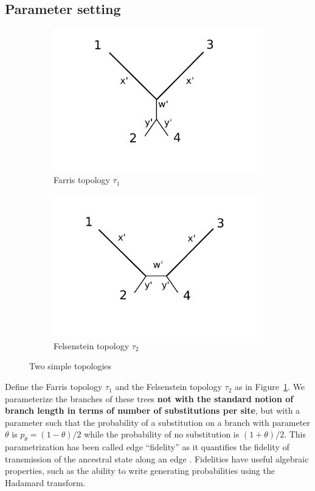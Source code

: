 \documentclass{article}
\begin{document}
\subsection{Parameter setting}

\begin{figure}
\centering
\begin{subfigure}{.45\linewidth}
\centering
\includegraphics[width=.95\textwidth]{farris_blank}
\caption[short]{Farris topology $\tau_1$}
\end{subfigure}
\begin{subfigure}{.45\linewidth}
\centering
\includegraphics[width=.95\textwidth]{felsenstein_blank}
\caption[short]{Felsenstein topology $\tau_2$}
\end{subfigure}
\caption{Two simple topologies}
\label{fig:farris-fels-top}
\end{figure}

Define the Farris topology $\tau_1$ and the Felsenstein topology $\tau_2$ as in Figure~\ref{fig:farris-fels-top}.
We parameterize the branches of these trees \textbf{not with the standard notion of branch length in terms of number of substitutions per site}, but with a parameter such that the probability of a substitution on a branch with parameter $\theta$ is $p_\theta = (1-\theta)/2$ while the probability of no substitution is $(1+\theta)/2$.
This parametrization has been called edge ``fidelity'' as it quantifies the fidelity of transmission of the ancestral state along an edge \cite{Matsen2007-jq}.
Fidelities have useful algebraic properties, such as the ability to write generating probabilities using the Hadamard transform.
\end{document}
